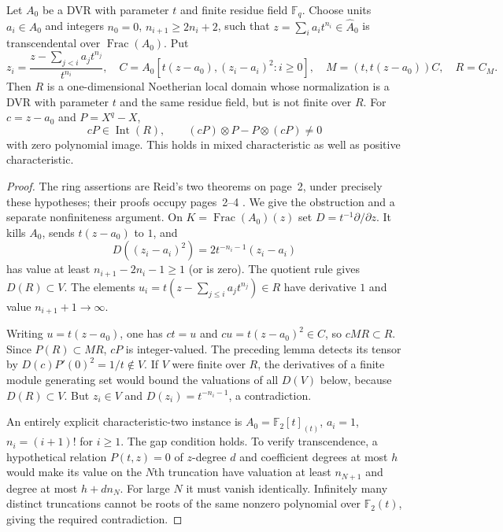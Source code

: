 \begin{example}\label{ex:akizuki-reid-polynomial-kernel}
Let $A_0$ be a DVR with parameter $t$ and finite residue field
$\mathbb F_q$. Choose units $a_i\in A_0$ and integers
$n_0=0$, $n_{i+1}\ge2n_i+2$, such that
$z=\sum_i a_it^{n_i}\in\widehat A_0$ is transcendental over
$\operatorname{Frac}(A_0)$. Put
\[
 z_i=\frac{z-\sum_{j<i}a_jt^{n_j}}{t^{n_i}},\quad
 C=A_0[t(z-a_0),(z_i-a_i)^2:i\ge0],\quad
 M=(t,t(z-a_0))C,\quad R=C_M.
\]
Then $R$ is a one-dimensional Noetherian local domain whose
normalization is a DVR with parameter $t$ and the same residue
field, but is not finite over $R$. For $c=z-a_0$ and $P=X^q-X$,
\[
 cP\in\operatorname{Int}(R),\qquad
              (cP)\otimes P-P\otimes(cP)\ne0
\]
with zero polynomial image. This holds in mixed characteristic
as well as positive characteristic.
\end{example}
\begin{proof}
The ring assertions are Reid's two theorems on page~2, under
precisely these hypotheses; their proofs occupy pages~2--4
\cite{Reid1995Akizuki}. We give the obstruction and a separate
nonfiniteness argument. On $K=\operatorname{Frac}(A_0)(z)$ set
$D=t^{-1}\partial/\partial z$. It kills $A_0$, sends
$t(z-a_0)$ to $1$, and
\[
              D((z_i-a_i)^2)=2t^{-n_i-1}(z_i-a_i)
\]
has value at least $n_{i+1}-2n_i-1\ge1$ (or is zero).
The quotient rule gives $D(R)\subset V$. The elements
$u_i=t(z-\sum_{j\le i}a_jt^{n_j})\in R$ have derivative $1$
and value $n_{i+1}+1\to\infty$.

Writing $u=t(z-a_0)$, one has $ct=u$ and $cu=t(z-a_0)^2\in C$,
so $cM R\subset R$. Since $P(R)\subset MR$, $cP$ is
integer-valued. The preceding lemma detects its tensor by
$D(c)P'(0)^2=1/t\notin V$.
If $V$ were finite over $R$, the derivatives of a finite module
generating set would bound the valuations of all $D(V)$ below,
because $D(R)\subset V$. But $z_i\in V$ and
$D(z_i)=t^{-n_i-1}$, a contradiction.

An entirely explicit characteristic-two instance is
$A_0=\mathbb F_2[t]_{(t)}$, $a_i=1$, $n_i=(i+1)!$ for $i\ge1$.
The gap condition holds. To verify transcendence, a hypothetical
relation $P(t,z)=0$ of $z$-degree $d$ and coefficient degrees at
most $h$ would make its value on the $N$th truncation have
valuation at least $n_{N+1}$ and degree at most $h+dn_N$.
For large $N$ it must vanish identically. Infinitely many distinct
truncations cannot be roots of the same nonzero polynomial over
$\mathbb F_2(t)$, giving the required contradiction.
\end{proof}

